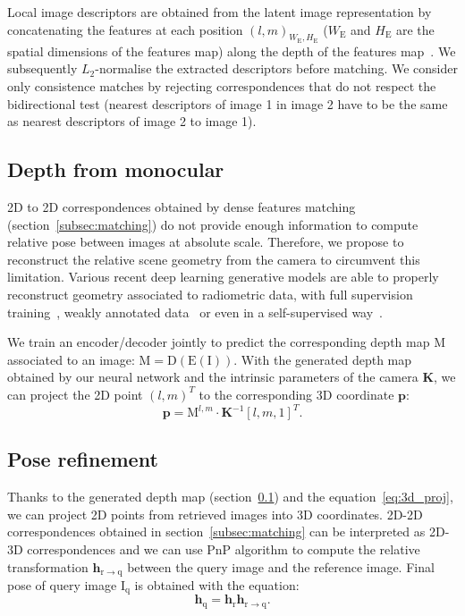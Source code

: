 Local image descriptors are obtained from the latent image representation by concatenating the features at each position $\left( l, m \right)_{W_\mathrm{E},H_\mathrm{E}}$ ($W_\mathrm{E}$ and $H_\mathrm{E}$ are the spatial dimensions of the features map) along the depth of the features map~\citep{Taira2018, Widya2018}. We subsequently $L_2$-normalise the extracted descriptors before matching. We consider only consistence matches by rejecting correspondences that do not respect the bidirectional test (nearest descriptors of image 1 in image 2 have to be the same as nearest descriptors of image 2 to image 1).

\subsection{Depth from monocular}
\label{subsec:depth_map}
2D to 2D correspondences obtained by dense features matching (section~\ref{subsec:matching}) do not provide enough information to compute relative pose between images at absolute scale. Therefore, we propose to reconstruct the relative scene geometry from the camera to circumvent this limitation. Various recent deep learning generative models are able to properly reconstruct geometry associated to radiometric data, with full supervision training~\cite{Eigen2014}, weakly annotated data~\cite{Godard2017} or even in a self-supervised way~\cite{Mahjourian2018}. 

We train an encoder/decoder jointly to predict the corresponding depth map $\mathrm{M}$ associated to an image: $\mathrm{M = D(E(I))}$. With the generated depth map obtained by our neural network and the intrinsic parameters of the camera $\mathbf{K}$, we can project the 2D point $\left( l, m \right)^T$ to the corresponding 3D coordinate $\mathbf{p}$:
\begin{equation}
	\label{eq:3d_proj}
	\mathbf{p} = \mathrm{M}^{l, m} \cdot \mathbf{K}^{-1}[l, m, 1]^T.
\end{equation}

\subsection{Pose refinement}
\label{subsec:pnlp}

Thanks to the generated depth map (section~\ref{subsec:depth_map}) and the equation~\ref{eq:3d_proj}, we can project 2D points from retrieved images into 3D coordinates. 2D-2D correspondences obtained in section~\ref{subsec:matching} can be interpreted as 2D-3D correspondences and we can use PnP algorithm to compute the relative transformation $\mathbf{h}_\mathrm{r \rightarrow q}$ between the query image and the reference image. Final pose of query image $\mathrm{I_q}$ is obtained with the equation:
\begin{equation}
	\mathbf{h}_\mathrm{q} = \mathbf{h}_\mathrm{r}\mathbf{h}_\mathrm{r \rightarrow q}.
\end{equation}

